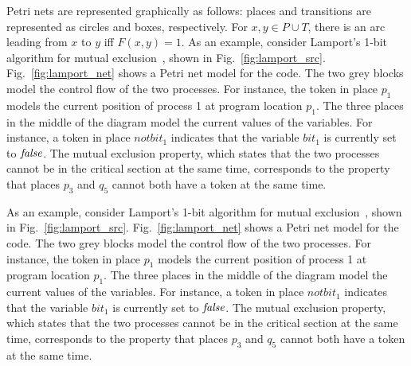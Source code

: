
Petri nets are represented graphically as follows: places and transitions
are represented as circles and boxes, respectively. For $x, y \in P \cup T$,
there is an arc leading from $x$ to $y$ if{}f $F(x,y)=1$.
%
As an example, consider Lamport's 1-bit
algorithm for mutual exclusion~\autocite{Lamport86}, shown in
Fig.~\ref{fig:lamport_src}.
Fig.~\ref{fig:lamport_net} shows a Petri net model for the code.
The two grey blocks model the control flow of the two
processes. For instance, the token in place $p_1$ models the current
position of process 1 at program location $p_1$. The three places in the middle of the
diagram model the current values of the variables. For instance, a
token in place $notbit_1$ indicates that the variable $bit_1$ is currently
set to $\operatorname{\mathit{false}}$.
The mutual exclusion property, which states that the two processes cannot be in the
critical section at the same time, corresponds to the property that
places $p_3$ and $q_5$ cannot both have a token at the same time.





As an example, consider Lamport's 1-bit
algorithm for mutual exclusion~\cite{Lamport86}, shown in
Fig.~\ref{fig:lamport_src}. 
Fig.~\ref{fig:lamport_net} shows a Petri net model for the code.
The two grey blocks model the control flow of the two
processes. For instance, the token in place $p_1$ models the current
position of process 1 at program location $p_1$. The three places in the middle of the
diagram model the current values of the variables. For instance, a
token in place $notbit_1$ indicates that the variable $bit_1$ is currently
set to $\operatorname{\mathit{false}}$.
The mutual exclusion property, which states that the two processes cannot be in the
critical section at the same time, corresponds to the property that
places $p_3$ and $q_5$ cannot both have a token at the same time.

